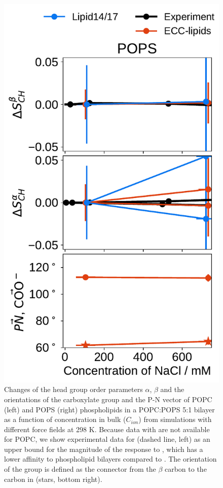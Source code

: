 \begin{figure}[tbp!]
  \includegraphics[width=\figwidthsmall]{../img/ecc_pops/order_parameters_changes_ecc-lip_L14_A-B-PN-COO_POPS_nacl.pdf} 
  \caption{\label{fig:delta_ordPar_NaCl} 
    Changes of the head group order parameters $\alpha$, $\beta$ and the orientations of the carboxylate group and the P-N vector  
    of POPC (left) and POPS (right) phospholipids in a POPC:POPS 5:1 bilayer as a function of  concentration 
    in bulk ($C_{ion}$) from simulations with different force fields at 298 K.
    Because data with  are not available for POPC, 
    we show experimental data for  (dashed line, left) \citep{roux90}
    as an upper bound for the magnitude of the response to , 
    which has a lower affinity to phospholipid bilayers compared to . 
    The orientation of the  group is defined as 
    the connector from the $\beta$ carbon to the carbon in  (stars, bottom right). 
  } 
\end{figure} 



